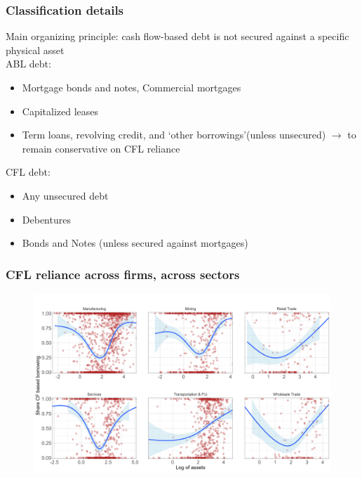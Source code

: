 \documentclass[notes]{beamer}
\begin{document}
\begin{frame}[label=Classification]
\frametitle{Classification details}
Main organizing principle: cash flow-based debt is not secured against a specific physical asset \vspace{4mm} \\
ABL debt: 
\begin{itemize}
\item Mortgage bonds and notes, Commercial mortgages
\item Capitalized leases
\item Term loans, revolving credit, and `other borrowings'(unless unsecured) $\rightarrow$ to remain conservative on CFL reliance
\end{itemize}

CFL debt: 
\begin{itemize}
\item Any unsecured debt
\item Debentures
\item Bonds and Notes (unless secured against mortgages)
\end{itemize}

\begin{center}
\hyperlink{DandC}{}
\end{center}

\end{frame}

\begin{frame}[label=Sector breakdown]
\frametitle{CFL reliance across firms, across sectors}
\begin{figure} [H]
\centering
\includegraphics[width=1 \textwidth]{smoothy1.png}
\end{figure} \noindent 
\begin{center}
\hyperlink{smoothy}{} \hspace{5mm}
\end{center}

\end{frame}
\end{document}
